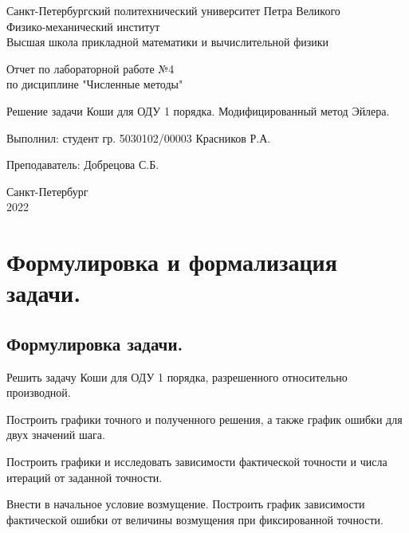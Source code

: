 \documentclass[a4paper, 12pt]{article}
\begin{document}
	\begin{titlepage}
		\begin{center}
			Санкт-Петербургский политехнический университет Петра Великого \\ Физико-механический институт \\ Высшая школа прикладной математики и вычислительной физики
		\end{center}
		\vspace{10em}
		\begin{center}
			\Large Отчет по лабораторной работе №4 \\ по дисциплине "Численные методы"
		\end{center}
		\vspace{1em}
		\begin{center}
			\Huge Решение задачи Коши для ОДУ 1 порядка. Модифицированный метод Эйлера.
		\end{center}
		\vspace{15em}
		{\Large 
			
			Выполнил: студент гр. 5030102/00003 Красников Р.А.
			\vspace{1em}
			
			Преподаватель: Добрецова С.Б.}
		\vspace{\fill}
		\begin{center}
			Санкт-Петербург \\ 2022
		\end{center}
	\end{titlepage}
	\newpage
	
	\section{Формулировка и формализация задачи.}
	
	\subsection{Формулировка задачи.}
	
	Решить задачу Коши для ОДУ 1 порядка, разрешенного относительно производной.
	
	Построить графики точного и полученного решения, а также график ошибки для двух значений шага.
	
	Построить графики и исследовать зависимости фактической точности и числа итераций от заданной точности.
	
	Внести в начальное условие возмущение. Построить график зависимости фактической ошибки от величины возмущения при фиксированной точности.  
	
\end{document}
